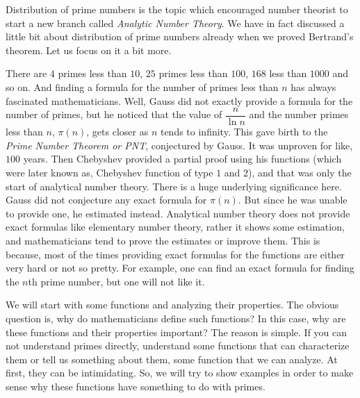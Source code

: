 Distribution of prime numbers is the topic which encouraged number theorist to start a new branch called \textit{Analytic Number Theory}. We have in fact discussed a little bit about distribution of prime numbers already when we proved Bertrand's theorem. Let us focus on it a bit more.

There are $4$ primes less than $10$, $25$ primes less than $100$, $168$ less than $1000$ and so on. And finding a formula for the number of primes less than $n$ has always fascinated mathematicians. Well, Gauss did not exactly provide a formula for the number of primes, but he noticed that the value of $\dfrac{n}{\ln n}$ and the number primes less than $n$, $\pi(n)$, gets closer as $n$ tends to infinity. This gave birth to the \textit{Prime Number Theorem or PNT}, conjectured by Gauss. It was unproven for like, $100$ years. Then Chebyshev provided a partial proof using his functions (which were later known as, Chebyshev function of type $1$ and $2$), and that was only the start of analytical number theory. There is a huge underlying significance here. Gauss did not conjecture any exact formula for $\pi(n)$. But since he was unable to provide one, he estimated instead. Analytical number theory does not provide exact formulas like elementary number theory, rather it shows some estimation, and mathematicians tend to prove the estimates or improve them. This is because, most of the times providing exact formulas for the functions are either very hard or not so pretty. For example, one can find an exact formula for finding the $n$th prime number, but one will not like it.

We will start with some functions and analyzing their properties. The obvious question is, why do mathematicians define such functions? In this case, why are these functions and their properties important? The reason is simple. If you can not understand primes directly, understand some functions that can characterize them or tell us something about them, some function that we can analyze. At first, they can be intimidating. So, we will try to show examples in order to make sense why these functions have something to do with primes.


